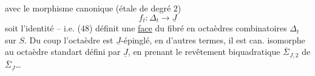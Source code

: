 avec le morphisme canonique (étale de degré $2$)
\[
f_t:\Delta_t\longrightarrow\underline J
\]
soit l'identité -- i.e. (48) définit une \uline{face} du fibré en octaèdres combinatoires $\Delta_t$ sur $S$. Du coup l'octaèdre est $\underline J$-épinglé, en d'autres termes, il est can. isomorphe au  octaèdre standart défini par $\underline J$,  en prenant le revêtement biquadratique $\bar\Sigma_{\underline J,2}$ de $\bar\Sigma_{\underline J}$\ldots

